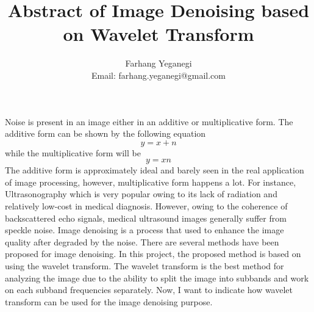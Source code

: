 \documentclass{article}
\title{Abstract of Image Denoising based on Wavelet Transform}
\date{}
\author{Farhang Yeganegi\\Email: farhang.yeganegi@gmail.com}
\begin{document}
\maketitle

Noise is present in an image either in an additive or multiplicative form. The additive form can be shown by the following equation\\
\begin{equation}
y = x + n
\end{equation}
while the multiplicative form will be\\
\begin{equation}
y = xn
\end{equation}
The additive form is approximately ideal and barely seen in the real application of image processing, however, multiplicative form happens a lot. For instance, Ultrasonography which is very popular owing to its lack of radiation and relatively low-cost in medical diagnosis. However, owing to the coherence of backscattered echo signals, medical ultrasound images generally suffer from speckle noise. Image denoising is a process that used to enhance the image quality after degraded by the noise. There are several methods have been proposed for image denoising. In this project, the proposed method is based on using the wavelet transform. The wavelet transform is the best method for analyzing the image due to the ability to split the image into subbands and work on each subband frequencies separately. Now, I want to indicate how wavelet transform can be used for the image denoising purpose.
\end{document}
